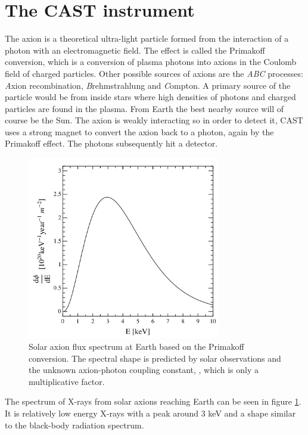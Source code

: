 \section{The CAST instrument}
The axion is a theoretical ultra-light particle formed from the interaction of a photon with an electromagnetic field. The effect is called the Primakoff conversion, which is a conversion of plasma photons into axions in the Coulomb field of charged particles. Other possible sources of axions are the \emph{ABC} processes: \emph{A}xion recombination, \emph{B}rehmstrahlung and \emph{C}ompton\cite{Redondo:2013td}. A primary source of the particle would be from inside stars where high densities of photons and charged particles are found in the plasma. From Earth the best nearby source will of course be the Sun. The axion is weakly interacting so in order to detect it, CAST uses a strong magnet to convert the axion back to a photon, again by the Primakoff effect. The photons subsequently hit a detector.

\begin{figure}[htbp]
  \centering
    \includegraphics[height=8cm]{figures/cast/axion_spectrum.png}
  \caption{\footnotesize Solar axion flux spectrum at Earth based on the Primakoff conversion. The spectral shape is predicted by solar observations and the unknown axion-photon coupling constant, \gay, which is only a multiplicative factor. }
  \label{fig:axion_spectrum}
\end{figure}

The spectrum of X-rays from solar axions reaching Earth can be seen in figure \ref{fig:axion_spectrum}. It is relatively low energy X-rays with a peak around 3 keV and a shape similar to the black-body radiation spectrum.

